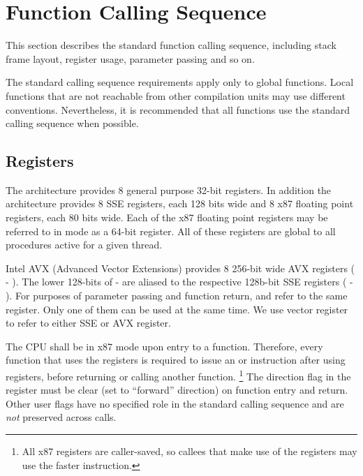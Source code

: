 
\section{Function Calling Sequence}

This section describes the standard function calling sequence,
including stack frame layout, register usage, parameter passing and so
on.

The standard calling sequence requirements apply only to global
functions.  Local functions that are not reachable from other
compilation units may use different conventions.  Nevertheless, it is
recommended that all functions use the standard calling sequence when
possible.

\subsection{Registers}
\label{subsec-registers}

The \xARCH architecture provides 8 general purpose 32-bit registers.
In addition the architecture provides 8 SSE registers, each 128 bits
wide and 8 x87 floating point registers, each 80 bits wide.  Each of
the x87 floating point registers may be referred to in \MMX
mode as a 64-bit register.  All of these registers are global to all
procedures active for a given thread.

Intel AVX (Advanced Vector Extensions) provides 8 256-bit wide AVX registers
( - ).  The lower 128-bits of  - 
are aliased to the respective 128b-bit SSE registers ( -
). For purposes of parameter passing and function return,
 and  refer to the same register. Only one of them
can be used at the same time.  We use vector register to refer to either
SSE or AVX register.

The CPU shall be in x87 mode upon entry to a function.  Therefore,
every function that uses the \MMX registers is required to issue an
 or  instruction after using \MMX registers, before
returning or calling another function.  \footnote{All x87 registers
are caller-saved, so callees that make use of the \MMX registers may
use the faster  instruction.}  The direction flag  in the
 register must be clear (set to ``forward'' direction) on function
entry and return.  Other user flags have no specified role in the
standard calling sequence and are {\em not} preserved across calls.

